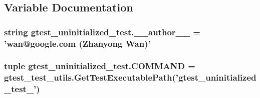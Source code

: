 \subsection{Variable Documentation}
\hypertarget{namespacegtest__uninitialized__test_aaaf66027b4590f6f1da732c0b2716e10}{
\subsubsection[{\-\_\-\-\_\-author\-\_\-\-\_\-}]{\setlength{\rightskip}{0pt plus 5cm}string gtest\-\_\-uninitialized\-\_\-test.\-\_\-\-\_\-author\-\_\-\-\_\- = 'wan@google.\-com (Zhanyong Wan)'}}\label{namespacegtest__uninitialized__test_aaaf66027b4590f6f1da732c0b2716e10}
\hypertarget{namespacegtest__uninitialized__test_a6341d3bb32a80c46bcca4fe5c72adf3f}{
\subsubsection[{C\-O\-M\-M\-A\-N\-D}]{\setlength{\rightskip}{0pt plus 5cm}tuple gtest\-\_\-uninitialized\-\_\-test.\-C\-O\-M\-M\-A\-N\-D = {\bf gtest\-\_\-test\-\_\-utils.\-Get\-Test\-Executable\-Path}('gtest\-\_\-uninitialized\-\_\-test\-\_\-')}}\label{namespacegtest__uninitialized__test_a6341d3bb32a80c46bcca4fe5c72adf3f}
